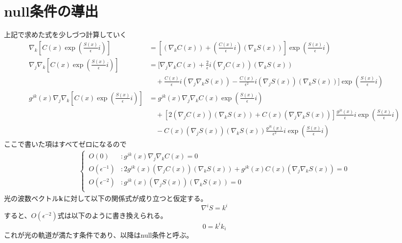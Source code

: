 \documentclass[dvipdfmx]{report} %
\begin{document}
\section{null条件の導出}
上記で求めた式を少しづつ計算していく
\begin{equation*}
\begin{split}
	\nabla_k \left[ C(x)\exp{ \left( \frac{S(x)}{\epsilon}i \right) } \right] &= 
		\left[
			( \nabla_k C(x) )
			+ \left( \frac{C(x)}{\epsilon}i \right) (\nabla_k S(x)) 
		\right] \exp \left( \frac{S(x)}{\epsilon} i \right)\\
	\nabla_j \nabla_k \left[ C(x)\exp{ \left( \frac{S(x)}{\epsilon}i \right) } \right] &= 
		[
			\nabla_j \nabla_k C(x)
			+ \frac{2}{\epsilon}i (\nabla_j C(x))(\nabla_k S(x))\\
		& \quad
			+ \frac{C(x)}{\epsilon}i (\nabla_j \nabla_k S(x))
			- \frac{C(x)}{\epsilon ^ 2}i (\nabla_j S(x))(\nabla_k S(x))
		] \exp \left( \frac{S(x)}{\epsilon} i \right)\\
	g^{jk}(x) \nabla_j \nabla_k \left[ C(x)\exp{ \left( \frac{S(x)}{\epsilon}i \right) } \right]
		&=
			g^{jk}(x) \nabla_j \nabla_k C(x) \exp \left( \frac{S(x)}{\epsilon} i \right) \\
		&\quad
			+ \left[
				2(\nabla_j C(x))(\nabla_k S(x)) + C(x) (\nabla_j \nabla_k S(x))
			\right]
			\frac{ g^{jk}(x) }{\epsilon}i \exp \left( \frac{S(x)}{\epsilon} i \right)\\
		&\quad
			- C(x) (\nabla_j S(x))(\nabla_k S(x)) \frac{ g^{jk}(x) }{\epsilon ^ 2}i 				\exp \left( \frac{S(x)}{\epsilon} i \right)
\end{split}
\end{equation*}
ここで書いた項はすべてゼロになるので
\begin{equation*}
\begin{split}
\left\{ \,
\begin{aligned}
	 O(0) &: g^{jk}(x) \nabla_j \nabla_k C(x) = 0\\
	 O(\epsilon^{-1}) &:
	 	2g^{jk}(x)(\nabla_j C(x))(\nabla_k S(x))
		+ g^{jk}(x)C(x) (\nabla_j \nabla_k S(x)) = 0\\
   	O(\epsilon^{-2}) &:
		g^{jk}(x) (\nabla_j S(x))(\nabla_k S(x)) = 0\\
\end{aligned}
\right.
\end{split}
\end{equation*}
光の波数ベクトル$\bold{k}$に対して以下の関係式が成り立つと仮定する。
\[ \nabla^i S = k^i \]
すると、$O(\epsilon^{-2})$式は以下のように書き換えられる。
\[0 = k^i k_i\]
これが光の軌道が満たす条件であり、以降はnull条件と呼ぶ。
\end{document}
